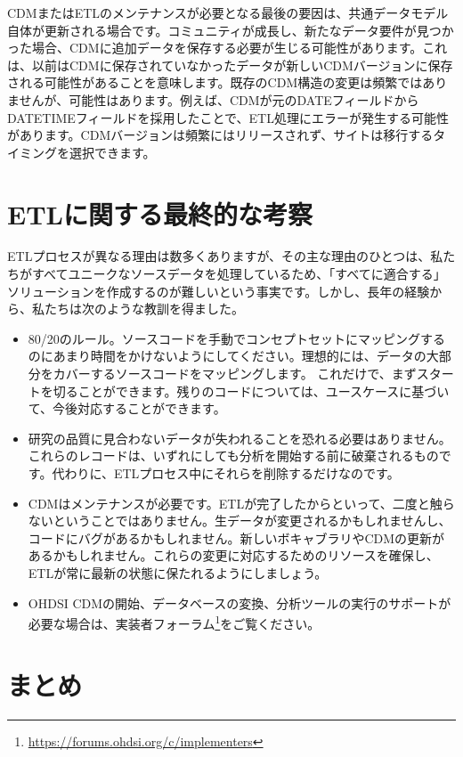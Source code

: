 \documentclass[
  11pt]{book}
\providecommand{\tightlist}{%
  \setlength{\itemsep}{0pt}\setlength{\parskip}{0pt}}
\theoremstyle{definition}
\theoremstyle{definition}
\theoremstyle{definition}
\theoremstyle{definition}
\theoremstyle{remark}
\begin{document}
CDMまたはETLのメンテナンスが必要となる最後の要因は、共通データモデル自体が更新される場合です。コミュニティが成長し、新たなデータ要件が見つかった場合、CDMに追加データを保存する必要が生じる可能性があります。これは、以前はCDMに保存されていなかったデータが新しいCDMバージョンに保存される可能性があることを意味します。既存のCDM構造の変更は頻繁ではありませんが、可能性はあります。例えば、CDMが元のDATEフィールドからDATETIMEフィールドを採用したことで、ETL処理にエラーが発生する可能性があります。CDMバージョンは頻繁にはリリースされず、サイトは移行するタイミングを選択できます。

\section{ETLに関する最終的な考察}\label{etlux306bux95a2ux3059ux308bux6700ux7d42ux7684ux306aux8003ux5bdf}

ETLプロセスが異なる理由は数多くありますが、その主な理由のひとつは、私たちがすべてユニークなソースデータを処理しているため、「すべてに適合する」ソリューションを作成するのが難しいという事実です。しかし、長年の経験から、私たちは次のような教訓を得ました。

\begin{itemize}
\tightlist
\item
  80/20のルール。ソースコードを手動でコンセプトセットにマッピングするのにあまり時間をかけないようにしてください。理想的には、データの大部分をカバーするソースコードをマッピングします。 これだけで、まずスタートを切ることができます。残りのコードについては、ユースケースに基づいて、今後対応することができます。
\item
  研究の品質に見合わないデータが失われることを恐れる必要はありません。これらのレコードは、いずれにしても分析を開始する前に破棄されるものです。代わりに、ETLプロセス中にそれらを削除するだけなのです。
\item
  CDMはメンテナンスが必要です。ETLが完了したからといって、二度と触らないということではありません。生データが変更されるかもしれませんし、コードにバグがあるかもしれません。新しいボキャブラリやCDMの更新があるかもしれません。これらの変更に対応するためのリソースを確保し、ETLが常に最新の状態に保たれるようにしましょう。
\item
  OHDSI CDMの開始、データベースの変換、分析ツールの実行のサポートが必要な場合は、実装者フォーラム\footnote{\url{https://forums.ohdsi.org/c/implementers}}をご覧ください。
\end{itemize}

\section{まとめ}\label{ux307eux3068ux3081-4}
\end{document}
